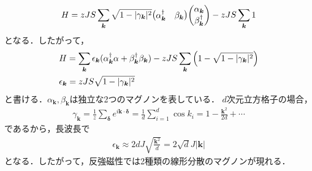 \documentclass[dvipdfmx,9pt]{beamer}
\numberwithin{equation}{section}
\begin{document}
\begin{frame}
    \begin{align}
        H 
        = zJS \sum_{\bm{k}} \sqrt{1-|\gamma_{\bm{k}}|^2}\mqty(\alpha_{\bm{k}}^\dagger & \beta_{\bm{k}})
        \mqty(\alpha_{\bm{k}}\\\beta_{\bm{k}}^\dagger)
        -zJS \sum_{\bm{k}} 1
    \end{align}
    となる．したがって，
    \begin{align}
        &
        H = \sum_{\bm{k}}\epsilon_{\bm{k}}(\alpha_{\bm{k}}^\dagger \alpha + \beta_{\bm{k}}^\dagger \beta_{\bm{k}})
        -
        zJS \sum_{\bm{k}}\qty(1 - \sqrt{1-|\gamma_{\bm{k}}|^2})
        \\ &
        \epsilon_{\bm{k}} = zJS \sqrt{1-|\gamma_{\bm{k}}|^2}
    \end{align}
    と書ける．$\alpha_{\bm{k}},\beta_{\bm{k}}$は独立な2つのマグノンを表している．
    $d$次元立方格子の場合，
    \begin{align}
        \gamma_{\bm{k}}
        = \frac{1}{z}\sum_{\bm{\delta}} e^{i \bm{k} \cdot \bm{\delta}}
        = \frac{1}{d} \sum_{i=1}^d \cos k_i 
        = 1 - \frac{\bm{k}^2}{2d} + \cdots
    \end{align}
    であるから，長波長で
    \begin{align}
        \epsilon_{\bm{k}} \approx 2dJ \sqrt{\frac{\bm{k}^2}{d}}
        = 2\sqrt{d}J|\bm{k}|
    \end{align}
    となる．したがって，反強磁性では2種類の線形分散のマグノンが現れる．
\end{frame}
\end{document}
